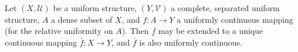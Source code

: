 Let $(X, \mathcal{U})$ be a uniform structure, $(Y, \mathcal{V})$ a complete, separated uniform structure, $A$ a dense subset of $X$, and $f: A \rightarrow Y$ a uniformly continuous mapping (for the relative uniformity on $A$). Then $f$ may be extended to a unique continuous mapping $\bar{f}: X \rightarrow Y$, and $\bar{f}$ is also uniformly continuous.